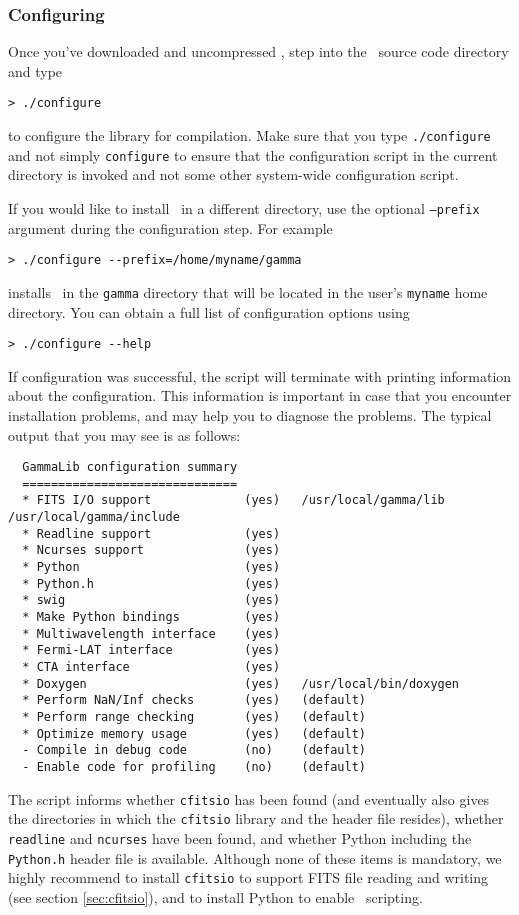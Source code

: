 \documentclass{article}[12pt,a4]
\begin{document}
\subsubsection{Configuring \this}
\label{sec:configure}

Once you've downloaded and uncompressed \this, step into the \this\ source code directory 
and type
\begin{verbatim}
> ./configure
\end{verbatim}
to configure the library for compilation.
Make sure that you type {\tt ./configure} and not simply {\tt configure} to ensure that the 
configuration script in the current directory is invoked and not some other system-wide 
configuration script.

If you would like to install \this\ in a different directory, use the optional {\tt --prefix} argument 
during the configuration step.
For example
\begin{verbatim}
> ./configure --prefix=/home/myname/gamma
\end{verbatim}
installs \this\ in the {\tt gamma} directory that will be located in the user's {\tt myname} home 
directory.
You can obtain a full list of configuration options using
\begin{verbatim}
> ./configure --help
\end{verbatim}

If configuration was successful, the script will terminate with printing information about
the configuration.
This information is important in case that you encounter installation problems, and may help
you to diagnose the problems.
The typical output that you may see is as follows:
\begin{verbatim}
  GammaLib configuration summary
  ==============================
  * FITS I/O support             (yes)   /usr/local/gamma/lib /usr/local/gamma/include
  * Readline support             (yes)    
  * Ncurses support              (yes)   
  * Python                       (yes)
  * Python.h                     (yes)
  * swig                         (yes)
  * Make Python bindings         (yes)
  * Multiwavelength interface    (yes)
  * Fermi-LAT interface          (yes)
  * CTA interface                (yes)
  * Doxygen                      (yes)   /usr/local/bin/doxygen
  * Perform NaN/Inf checks       (yes)   (default)
  * Perform range checking       (yes)   (default)
  * Optimize memory usage        (yes)   (default)
  - Compile in debug code        (no)    (default)
  - Enable code for profiling    (no)    (default)
\end{verbatim}
The script informs whether {\tt cfitsio} has been found (and eventually also gives the
directories in which the {\tt cfitsio} library and the header file resides), whether {\tt readline}
and {\tt ncurses} have been found, and whether Python including the {\tt Python.h}
header file is available.
Although none of these items is mandatory, we highly recommend to install {\tt cfitsio}
to support FITS file reading and writing (see section \ref{sec:cfitsio}), and to install
Python to enable \this\ scripting.
\end{document}
